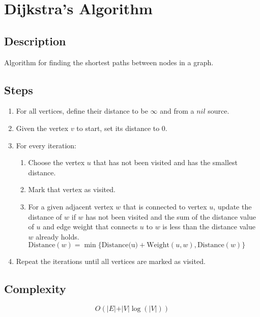 \section{Dijkstra's Algorithm}

\subsection*{Description}
Algorithm for finding the shortest paths between nodes in a graph.

\subsection*{Steps}
\begin{enumerate}
	\item For all vertices, define their distance to be $\infty$ and from a $nil$ source.
	\item Given the vertex $v$ to start, set its distance to 0.
	\item For every iteration:
	\begin{enumerate}
		\item Choose the vertex $u$ that has not been visited and has the smallest distance.
		\item Mark that vertex as visited.
		\item For a given adjacent vertex $w$ that is connected to vertex $u$, update the distance of $w$ if $w$ has not been visited and the sum of the distance value of $u$ and edge weight that connects $u$ to $w$ is less than the distance value $w$ already holds.\\
		$\text{Distance}(w) = \min\{ \text{Distance(u)} + \text{Weight}(u,w),  \text{Distance}(w)  \}$
	\end{enumerate}
	\item Repeat the iterations until all vertices are marked as visited.
\end{enumerate}

\subsection*{Complexity}
$$
O(\vert E \vert + \vert V \vert \log( \vert V \vert) )
$$

\newpage

